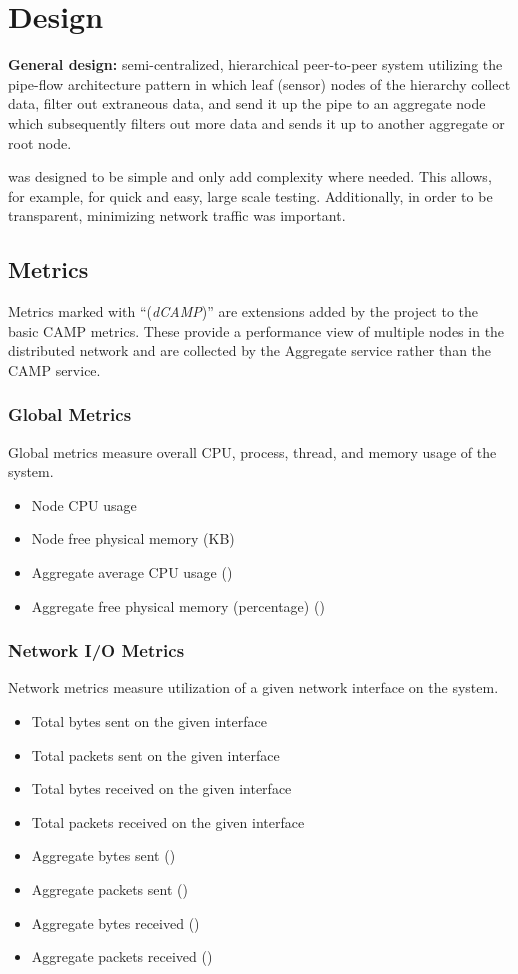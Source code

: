\chapter{Design}
\label{design}

\textbf{General design:} semi-centralized, hierarchical peer-to-peer system utilizing the pipe-flow architecture pattern
in which leaf (sensor) nodes of the hierarchy collect data, filter out extraneous data, and send it up the pipe to an
aggregate node which subsequently filters out more data and sends it up to another aggregate or root node.

\dcamp was designed to be simple and only add complexity where needed. This allows, for example, for quick and easy,
large scale testing. Additionally, in order to be transparent, minimizing network traffic was important.

\section{\dcamp Metrics}
\label{dcamp_metrics}
Metrics marked with ``(\emph{dCAMP})'' are extensions added by the \dcamp project to the basic CAMP metrics. These provide a
performance view of multiple nodes in the distributed network and are collected by the Aggregate service rather than the
CAMP service.

\subsection{Global Metrics}
Global metrics measure overall CPU, process, thread, and memory usage of the system.
\begin{itemize}
\item Node CPU usage 
\item Node free physical memory (KB) 
\item Aggregate average CPU usage (\dcamp) 
\item Aggregate free physical memory (percentage) (\dcamp)
\end{itemize}

\subsection{Network I/O Metrics}
Network metrics measure utilization of a given network interface on the system.
\begin{itemize}
\item Total bytes sent on the given interface 
\item Total packets sent on the given interface 
\item Total bytes received on the given interface 
\item Total packets received on the given interface 
\item Aggregate bytes sent (\dcamp) 
\item Aggregate packets sent (\dcamp) 
\item Aggregate bytes received (\dcamp) 
\item Aggregate packets received (\dcamp)
\end{itemize}

